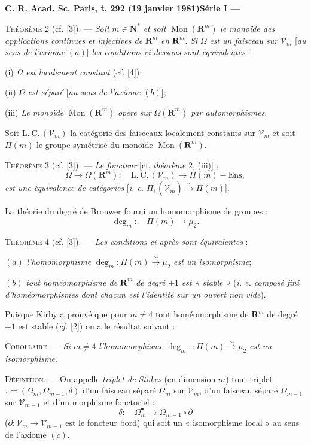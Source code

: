 \textbf{C. R. Acad. Sc. Paris, t. 292 (19 janvier 1981)\hfill Série I --- }

\textsc{Théorème} 2 (cf. [3]). --- \textit{Soit} $m\in\mathbf{N}^{*}$ \textit{et soit} $\operatorname{Mon}(\mathbf{R}^m)$ \textit{le monoïde des applications continues et injectives de} $\mathbf{R}^m$ \textit{en} $\mathbf{R}^m$. \textit{Si} $\Omega$ \textit{est un faisceau sur} $\mathscr{V}_m$ [\textit{au sens de l'axiome} $(a)$] \textit{les conditions ci-dessous sont équivalentes} :

(i) $\Omega$ \textit{est localement constant} (cf. [4]);

(ii) $\Omega$ \textit{est séparé} [\textit{au sens de l'axiome} $(b)$];

(iii) \textit{Le monoïde} $\operatorname{Mon}(\mathbf{R}^m)$ \textit{opère sur} $\Omega(\mathbf{R}^m)$ \textit{par automorphismes}.

Soit $\mathrm{L.\ C.}\,(\mathscr{V}_m)$ la catégorie des faisceaux localement constants sur $\mathscr{V}_m$ et soit $\Pi(m)$ le groupe symétrisé du monoïde $\operatorname{Mon}(\mathbf{R}^m)$.

\textsc{Théorème} 3 (cf. [3]). --- \textit{Le foncteur} [cf. \textit{théorème} 2, (iii)] :
\[
\Omega\to\Omega(\mathbf{R}^m):\quad\mathrm{L.\ C.}\,(\mathscr{V}_m)\to\Pi(m)-\mathrm{Ens},
\]
\textit{est une équivalence de catégories} [\textit{i. e.} $\Pi_1(\tilde{\mathscr{V}}_m)\overset{\sim}{\to}\Pi(m)$].

La théorie du degré de Brouwer fourni un homomorphisme de groupes :
\[
\deg_m:\quad\Pi(m)\to\mu_2.
\]

\textsc{Théorème} 4 (cf. [3]). --- \textit{Les conditions ci-après sont équivalentes} :

$(a)$ \textit{l'homomorphisme} $\deg_m:\Pi(m)\overset{\sim}{\to}\mu_2$ \textit{est un isomorphisme};

$(b)$ \textit{tout homéomorphisme de} $\mathbf{R}^m$ \textit{de degré} $+1$ \textit{est « stable »} (\textit{i. e. composé fini d'homéomorphismes dont chacun est l'identité sur un ouvert non vide}).

Puisque Kirby a prouvé que pour $m\ne4$ tout homéomorphisme de $\mathbf{R}^m$ de degré $+1$ est stable (\textit{cf.} [2]) on a le résultat suivant :

\textsc{Corollaire}. --- \textit{Si} $m\ne4$ \textit{l'homomorphisme} $\deg_m::\Pi(m)\overset{\sim}{\to}\mu_2$ \textit{est un isomorphisme}.

\textsc{Définition}. --- On appelle \textit{triplet de Stokes} (en dimension $m$) tout triplet $\tau=(\Omega_m,\Omega_{m-1},\delta)$ d'un faisceau séparé $\Omega_m$ sur $\mathscr{V}_m$, d'un faisceau séparé $\Omega_{m-1}$ sur $\mathscr{V}_{m-1}$ et d'un morphisme fonctoriel :
\[
\delta:\quad\Omega_m^{\bullet}\to\Omega_{m-1}\circ\partial
\]
($\partial:\mathscr{V}_m\to\mathscr{V}_{m-1}$ est le foncteur bord) qui soit un « isomorphisme local » au sens de l'axiome $(c)$.


